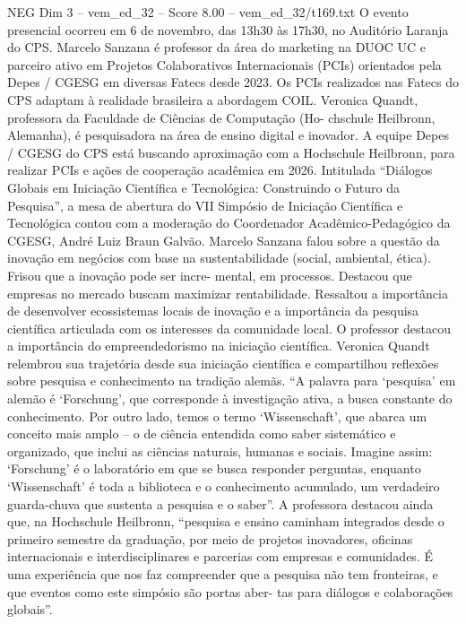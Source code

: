 \begin{textsample}{NEG Dim 3 – vem\_ed\_32 – Score 8.00 – vem\_ed\_32/t169.txt}
O evento presencial ocorreu em 6 de novembro, das 13h30 às 17h30, no Auditório Laranja do CPS.
Marcelo Sanzana é professor da área do marketing na DUOC UC e parceiro ativo em Projetos Colaborativos Internacionais (PCIs) orientados pela Depes / CGESG em diversas Fatecs desde 2023.
Os PCIs realizados nas Fatecs do CPS adaptam à realidade brasileira a abordagem COIL.
Veronica Quandt, professora da Faculdade de Ciências de Computação (Ho- chschule Heilbronn, Alemanha), é pesquisadora na área de ensino digital e inovador.
A equipe Depes / CGESG do CPS está buscando aproximação com a Hochschule Heilbronn, para realizar PCIs e ações de cooperação acadêmica em 2026.
Intitulada “Diálogos Globais em Iniciação Científica e Tecnológica: Construindo o Futuro da Pesquisa”, a mesa de abertura do VII Simpósio de Iniciação Científica e Tecnológica contou com a moderação do Coordenador Acadêmico-Pedagógico da CGESG, André Luiz Braun Galvão.
Marcelo Sanzana falou sobre a questão da inovação em negócios com base na sustentabilidade (social, ambiental, ética).
Frisou que a inovação pode ser incre- mental, em processos.
Destacou que empresas no mercado buscam maximizar rentabilidade.
Ressaltou a importância de desenvolver ecossistemas locais de inovação e a importância da pesquisa científica articulada com os interesses da comunidade local.
O professor destacou a importância do empreendedorismo na iniciação científica.
Veronica Quandt relembrou sua trajetória desde sua iniciação científica e compartilhou reflexões sobre pesquisa e conhecimento na tradição alemãs. “A palavra para ‘pesquisa’ em alemão é ‘Forschung’, que corresponde à investigação ativa, a busca constante do conhecimento.
Por outro lado, temos o termo ‘Wissenschaft’, que abarca um conceito mais amplo – o de ciência entendida como saber sistemático e organizado, que inclui as ciências naturais, humanas e sociais.
Imagine assim: ‘Forschung’ é o laboratório em que se busca responder perguntas, enquanto ‘Wissenschaft’ é toda a biblioteca e o conhecimento acumulado, um verdadeiro guarda-chuva que sustenta a pesquisa e o saber”.
A professora destacou ainda que, na Hochschule Heilbronn, “pesquisa e ensino caminham integrados desde o primeiro semestre da graduação, por meio de projetos inovadores, oficinas internacionais e interdisciplinares e parcerias com empresas e comunidades.
É uma experiência que nos faz compreender que a pesquisa não tem fronteiras, e que eventos como este simpósio são portas aber- tas para diálogos e colaborações globais”.

\end{textsample}
